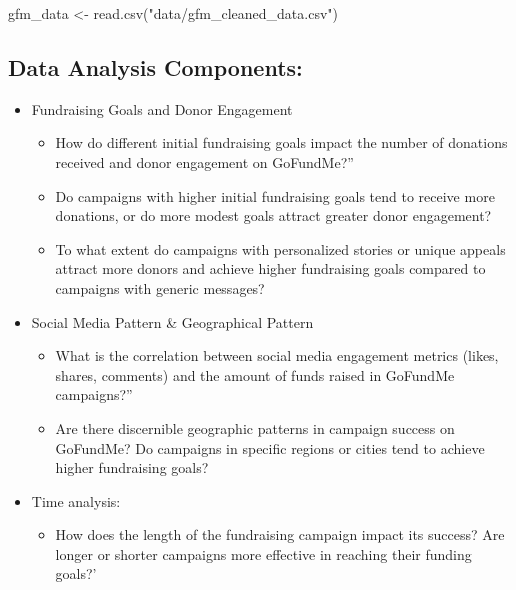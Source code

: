 \documentclass[
  letterpaper,
  DIV=11,
  numbers=noendperiod]{scrartcl}
\newenvironment{Shaded}{\begin{snugshade}}{\end{snugshade}}
\newcommand{\FunctionTok}[1]{\textcolor[rgb]{0.28,0.35,0.67}{#1}}
\newcommand{\NormalTok}[1]{\textcolor[rgb]{0.00,0.23,0.31}{#1}}
\newcommand{\OtherTok}[1]{\textcolor[rgb]{0.00,0.23,0.31}{#1}}
\newcommand{\StringTok}[1]{\textcolor[rgb]{0.13,0.47,0.30}{#1}}
\providecommand{\tightlist}{%
  \setlength{\itemsep}{0pt}\setlength{\parskip}{0pt}}\usepackage{longtable,booktabs,array}
\begin{document}
\begin{Shaded}
\begin{Highlighting}[]
\NormalTok{gfm\_data }\OtherTok{\textless{}{-}} \FunctionTok{read.csv}\NormalTok{(}\StringTok{"data/gfm\_cleaned\_data.csv"}\NormalTok{)}
\end{Highlighting}
\end{Shaded}

\hypertarget{data-analysis-components}{%
\subsection{Data Analysis Components:}\label{data-analysis-components}}

\begin{itemize}
\item
  Fundraising Goals and Donor Engagement

  \begin{itemize}
  \item
    How do different initial fundraising goals impact the number of
    donations received and donor engagement on GoFundMe?''
  \item
    Do campaigns with higher initial fundraising goals tend to receive
    more donations, or do more modest goals attract greater donor
    engagement?
  \item
    To what extent do campaigns with personalized stories or unique
    appeals attract more donors and achieve higher fundraising goals
    compared to campaigns with generic messages?
  \end{itemize}
\item
  Social Media Pattern \& Geographical Pattern

  \begin{itemize}
  \item
    What is the correlation between social media engagement metrics
    (likes, shares, comments) and the amount of funds raised in GoFundMe
    campaigns?''
  \item
    Are there discernible geographic patterns in campaign success on
    GoFundMe? Do campaigns in specific regions or cities tend to achieve
    higher fundraising goals?
  \end{itemize}
\item
  Time analysis:

  \begin{itemize}
  \tightlist
  \item
    How does the length of the fundraising campaign impact its success?
    Are longer or shorter campaigns more effective in reaching their
    funding goals?'
  \end{itemize}
\end{itemize}
\end{document}
